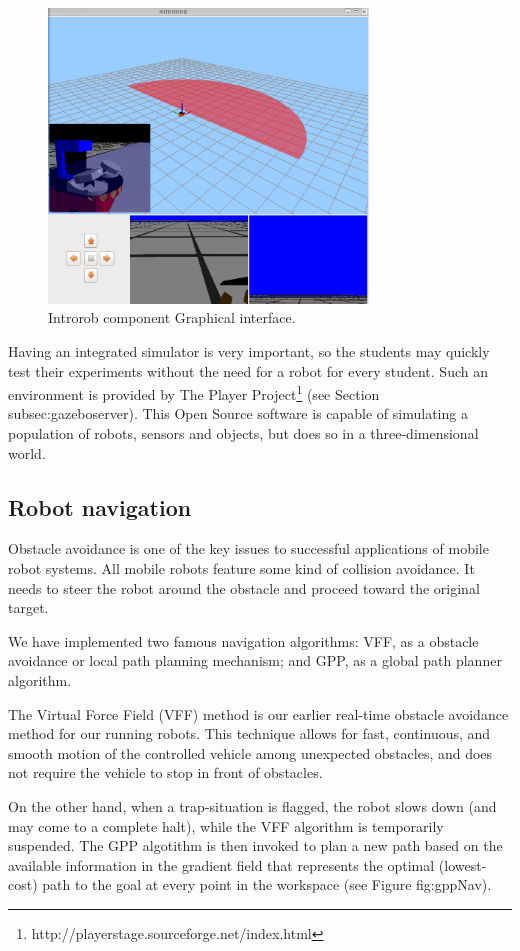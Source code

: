 \documentclass[twocolumn]{svjour3}          %
\begin{document}
\begin{figure}[h!]
  \includegraphics[width=8.5cm]{figs/introrob.jpg}
\caption{Introrob component Graphical interface.}
\label{fig:introrob}
\end{figure}

Having an integrated simulator is very important, so the students may quickly test their experiments without the need for a robot for every student. Such an environment is provided by The Player Project\footnote{http://playerstage.sourceforge.net/index.html} (see Section {subsec:gazeboserver}). This Open Source software is capable of simulating a population of robots, sensors and objects, but does so in a three-dimensional world.

\subsection{Robot navigation}

Obstacle avoidance is one of the key issues to successful applications of mobile robot systems. All mobile robots feature some kind of collision avoidance. It needs to steer the robot around the obstacle and proceed toward the original target.

We have implemented two famous navigation algorithms: VFF, as a obstacle avoidance or local path planning mechanism; and GPP, as a global path planner algorithm.

The Virtual Force Field (VFF) method is our earlier real-time obstacle avoidance method for our running robots. This technique allows for fast, continuous, and smooth motion of the controlled vehicle among unexpected obstacles, and does not require the vehicle to stop in front of obstacles.

On the other hand, when a trap-situation is flagged, the robot slows down (and may come to a complete halt),
while the VFF algorithm is temporarily suspended. The GPP algotithm is then invoked to plan a new path based on the available information in the gradient field that represents the optimal (lowest-cost) path to the goal at every point in the workspace (see Figure {fig:gppNav}).
\end{document}
